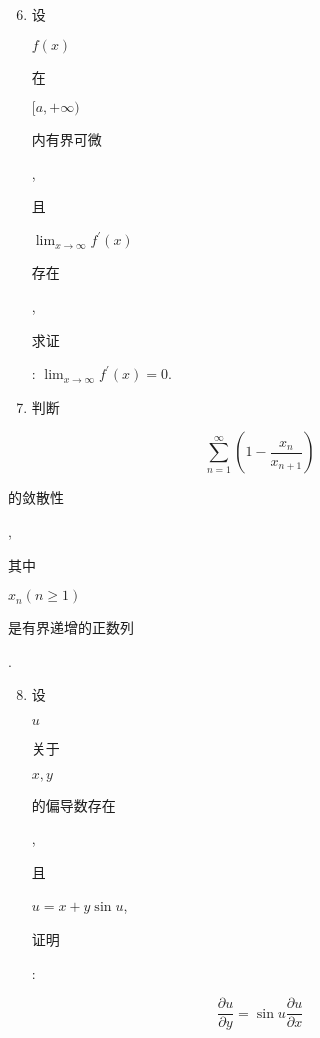 \documentclass[10pt]{article}
\begin{document}
\begin{enumerate}
  \setcounter{enumi}{5}
  \item \begin{CJK}{UTF8}{mj}设\end{CJK} $f(x)$ \begin{CJK}{UTF8}{mj}在\end{CJK} $[a,+\infty)$ \begin{CJK}{UTF8}{mj}内有界可微\end{CJK}, \begin{CJK}{UTF8}{mj}且\end{CJK} $\lim _{x \rightarrow \infty} f^{\prime}(x)$ \begin{CJK}{UTF8}{mj}存在\end{CJK}, \begin{CJK}{UTF8}{mj}求证\end{CJK}: $\lim _{x \rightarrow \infty} f^{\prime}(x)=0$.

  \item \begin{CJK}{UTF8}{mj}判断\end{CJK}

\end{enumerate}
$$
\sum_{n=1}^{\infty}\left(1-\frac{x_{n}}{x_{n+1}}\right)
$$
\begin{CJK}{UTF8}{mj}的敛散性\end{CJK}, \begin{CJK}{UTF8}{mj}其中\end{CJK} $x_{n}(n \geq 1)$ \begin{CJK}{UTF8}{mj}是有界递增的正数列\end{CJK}.

\begin{enumerate}
  \setcounter{enumi}{7}
  \item \begin{CJK}{UTF8}{mj}设\end{CJK} $u$ \begin{CJK}{UTF8}{mj}关于\end{CJK} $x, y$ \begin{CJK}{UTF8}{mj}的偏导数存在\end{CJK}, \begin{CJK}{UTF8}{mj}且\end{CJK} $u=x+y \sin u$, \begin{CJK}{UTF8}{mj}证明\end{CJK}:
\end{enumerate}
$$
\frac{\partial u}{\partial y}=\sin u \frac{\partial u}{\partial x}
$$
\end{document}

